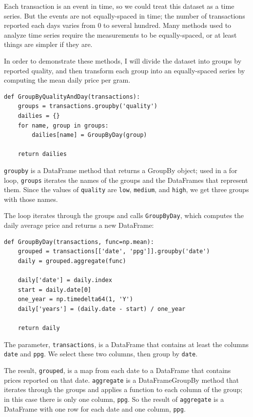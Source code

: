 \documentclass[12pt]{book}
\begin{document}
Each transaction is an event in time, so we could treat this dataset
as a time series.  But the events are not equally-spaced in time; the
number of transactions reported each days varies from 0 to several
hundred.  Many methods used to analyze time series require the
measurements to be equally-spaced, or at least things are simpler if
they are.

In order to demonstrate these methods, I will divide the dataset
into groups by reported quality, and then transform each group into
an equally-spaced series by computing the mean daily price per gram.

\begin{verbatim}
def GroupByQualityAndDay(transactions):
    groups = transactions.groupby('quality')
    dailies = {}
    for name, group in groups:
        dailies[name] = GroupByDay(group)        

    return dailies
\end{verbatim}

{\tt groupby} is a DataFrame method that returns a GroupBy
object; used in a for loop, {\tt groups} iterates the names of the groups
and the DataFrames that represent them.
Since the values of {\tt quality}
are {\tt low}, {\tt medium}, and {\tt high}, we get three groups with
those names.

The loop iterates through the groups and calls {\tt GroupByDay},
which computes the daily average price and returns a new DataFrame:

\begin{verbatim}
def GroupByDay(transactions, func=np.mean):
    grouped = transactions[['date', 'ppg']].groupby('date')
    daily = grouped.aggregate(func)

    daily['date'] = daily.index
    start = daily.date[0]
    one_year = np.timedelta64(1, 'Y')
    daily['years'] = (daily.date - start) / one_year

    return daily
\end{verbatim}

The parameter, {\tt transactions}, is a DataFrame that contains at
least the columns {\tt date} and {\tt ppg}.  We select these two
columns, then group by {\tt date}.

The result, {\tt grouped}, is a map from each date to a DataFrame that
contains prices reported on that date.  {\tt aggregate} is a
DataFrameGroupBy method that iterates through the groups and applies a
function to each column of the group; in this case there is only one
column, {\tt ppg}.  So the result of {\tt aggregate} is a DataFrame
with one row for each date and one column, {\tt ppg}.
\end{document}
